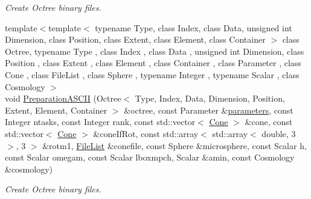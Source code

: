 \begin{DoxyCompactItemize}
\begin{DoxyCompactList}\small\item\em Create Octree binary files. \end{DoxyCompactList}\item 
{\footnotesize template$<$template$<$ typename Type, class Index, class Data, unsigned int Dimension, class Position, class Extent, class Element, class Container $>$ class Octree, typename Type , class Index , class Data , unsigned int Dimension, class Position , class Extent , class Element , class Container , class Parameter , class Cone , class File\-List , class Sphere , typename Integer , typename Scalar , class Cosmology $>$ }\\void \hyperlink{classCreate__octree_a5b1bddfafec3deb6f721001e75cd6ee3}{Preparation\-A\-S\-C\-I\-I} (Octree$<$ Type, Index, Data, Dimension, Position, Extent, Element, Container $>$ \&octree, const Parameter \&\hyperlink{rays_8h_ae1bc8b0b8c8b9f8e4cc61a5cc7c4ce9e}{parameters}, const Integer ntasks, const Integer rank, const std\-::vector$<$ \hyperlink{exceptionCone}{Cone} $>$ \&cone, const std\-::vector$<$ \hyperlink{exceptionCone}{Cone} $>$ \&cone\-If\-Rot, const std\-::array$<$ std\-::array$<$ double, 3 $>$, 3 $>$ \&rotm1, \hyperlink{exceptionmagrathea_1_1FileList}{File\-List} \&conefile, const Sphere \&microsphere, const Scalar h, const Scalar omegam, const Scalar lboxmpch, Scalar \&amin, const Cosmology \&cosmology)
\begin{DoxyCompactList}\small\item\em Create Octree binary files. \end{DoxyCompactList}\end{DoxyCompactItemize}
